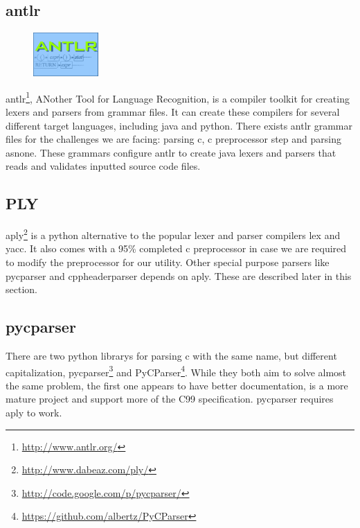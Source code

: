 \subsection{\gls{antlr}}
\label{sec:pre:antlr}
\begin{figure}
	\vspace{-20pt}
	\includegraphics[width=2.5cm]{./planning/img/antlr_logo}
	\vspace{-20pt}
\end{figure}
\gls{antlr}\footnote{\url{http://www.antlr.org/}}, ANother Tool for Language
Recognition, is a compiler toolkit for creating \glspl{lexer} and \glspl{parser} from grammar
files. It can create these compilers for several different target languages,
including \Gls{java} and \Gls{python}. There exists \gls{antlr} grammar files for the challenges
we are facing: parsing \Gls{c}, \Gls{c} \gls{preprocessor} step and parsing \gls{asnone}. These grammars
configure \gls{antlr} to create \Gls{java} \glspl{lexer} and \glspl{parser} that reads and validates
inputted source code files.

\subsection{PLY}
\Gls{aply}\footnote{\url{http://www.dabeaz.com/ply/}} is a \Gls{python} alternative to the
popular \gls{lexer} and \gls{parser} compilers lex and yacc. It also comes with a 95\%
completed \Gls{c} \gls{preprocessor} in case we are required to modify the \gls{preprocessor}
for our \gls{utility}. Other special purpose \glspl{parser} like \gls{pycparser} and
cppheaderparser depends on \Gls{aply}. These are described later in this section.

\subsection{\gls{pycparser}}
\label{sec:pre:pycparser}
There are two \Gls{python} \glspl{library} for parsing \Gls{c} with the same name, but different
capitalization, \gls{pycparser}\footnote{\url{http://code.google.com/p/pycparser/}}
and PyCParser\footnote{\url{https://github.com/albertz/PyCParser}}. While they
both aim to solve almost the same problem, the first one appears to have better
documentation, is a more mature project and support more of the \Gls{C99}
specification. \gls{pycparser} requires \Gls{aply} to work.

